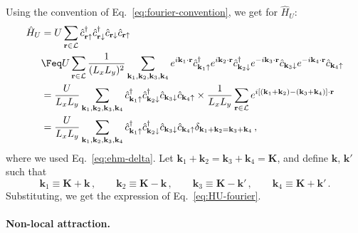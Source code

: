 \begin{tabproof}
	
	Using the convention of Eq.~\eqref{eq:fourier-convention}, we get for $\hat H_U$:
	\[
	\begin{aligned}
		\hat H_U &= U \sum_{\mathbf{r}\in\mathcal{L}} \hat c_{\mathbf{r}\uparrow}^\dagger \hat c_{\mathbf{r}\downarrow}^\dagger \hat c_{\mathbf{r}\downarrow} \hat c_{\mathbf{r}\uparrow} \\
		&\Feq U \sum_{\mathbf{r}\in\mathcal{L}} \frac{1}{(L_x L_y)^2} \sum_{\mathbf{k}_1,\mathbf{k}_2,\mathbf{k}_3,\mathbf{k}_4} e^{i \mathbf{k}_1 \cdot \mathbf{r}} \hat c_{\mathbf{k}_1 \uparrow}^\dagger e^{i \mathbf{k}_2 \cdot \mathbf{r}} \hat c_{\mathbf{k}_2 \downarrow}^\dagger e^{-i \mathbf{k}_3 \cdot \mathbf{r}} \hat c_{\mathbf{k}_3 \downarrow} e^{-i \mathbf{k}_4 \cdot \mathbf{r}} \hat c_{\mathbf{k}_4 \uparrow} \\
		&= \frac{U}{L_x L_y} \sum_{\mathbf{k}_1,\mathbf{k}_2,\mathbf{k}_3,\mathbf{k}_4} \hat c_{\mathbf{k}_1 \uparrow}^\dagger \hat c_{\mathbf{k}_2 \downarrow}^\dagger \hat c_{\mathbf{k}_3 \downarrow} \hat c_{\mathbf{k}_4 \uparrow} \times \frac{1}{L_x L_y} \sum_{\mathbf{r}\in\mathcal{L}} e^{i \left[ (\mathbf{k}_1 + \mathbf{k}_2) - (\mathbf{k}_3 + \mathbf{k}_4) \right] \cdot \mathbf{r}} \\
		&= \frac{U}{L_x L_y} \sum_{\mathbf{k}_1,\mathbf{k}_2,\mathbf{k}_3,\mathbf{k}_4} \hat c_{\mathbf{k}_1 \uparrow}^\dagger \hat c_{\mathbf{k}_2 \downarrow}^\dagger \hat c_{\mathbf{k}_3 \downarrow} \hat c_{\mathbf{k}_4 \uparrow} \delta_{\mathbf{k}_1+\mathbf{k}_2 = \mathbf{k}_3+\mathbf{k}_4} \, ,
	\end{aligned}
	\]
	where we used Eq.~\eqref{eq:ehm-delta}. Let $\mathbf{k}_1 + \mathbf{k}_2 = \mathbf{k}_3 + \mathbf{k}_4 = \mathbf{K}$, and define $\mathbf{k}$, $\mathbf{k}'$ such that
	\[
		\mathbf{k}_1 \equiv \mathbf{K} + \mathbf{k} \, ,
		\qquad
		\mathbf{k}_2 \equiv \mathbf{K} - \mathbf{k} \, ,
		\qquad
		\mathbf{k}_3 \equiv \mathbf{K} - \mathbf{k}' \, ,
		\qquad
		\mathbf{k}_4 \equiv \mathbf{K} + \mathbf{k}' \, .
	\]
	Substituting, we get the expression of Eq.~\eqref{eq:HU-fourier}.

\end{tabproof}

\paragraph{Non-local attraction.}

